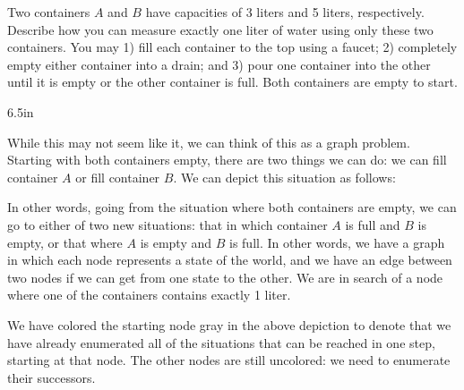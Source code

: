 \begin{prob}
    Two containers $A$ and $B$ have capacities of 3 liters and 5 liters,
    respectively. Describe how you can measure exactly one liter of water
    using only these two containers. You may 1) fill each container to the
    top using a faucet; 2) completely empty either container into a drain;
    and 3) pour one container into the other until it is empty or the other
    container is full. Both containers are empty to start.

    \begin{responsebox}{6.5in}
        \newcommand{\state}[2]{$\frac{#1}{3}\quad\frac{#2}{5}$}


        While this may not seem like it, we can think of this as a graph
        problem. Starting with both containers empty, there are two things
        we can do: we can fill container $A$ or fill container $B$. We can depict this situation as follows:
        \begin{center}
        \end{center}
        In other words, going from the situation where both containers are
        empty, we can go to either of two new situations: that in which
        container $A$ is full and $B$ is empty, or that where $A$ is empty
        and $B$ is full. In other words, we have a graph in which each node
        represents a state of the world, and we have an edge between two
        nodes if we can get from one state to the other. We are in search
        of a node where one of the containers contains exactly 1 liter.

        We have colored the starting node gray in the above depiction to
        denote that we have already enumerated all of the situations that
        can be reached in one step, starting at that node. The other nodes
        are still uncolored: we need to enumerate their successors.


\end{responsebox}
\end{prob}
